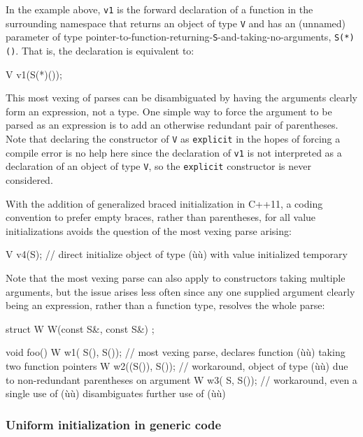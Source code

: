 \noindent In the example above, \lstinline!v1! is the forward declaration of a
function in the surrounding namespace that returns an object of type
\lstinline!V! and has an (unnamed) parameter of type
pointer-to-function-returning-\lstinline!S!-and-taking-no-arguments,
\lstinline!S(*)()!. That is, the declaration is equivalent to:

\begin{emcppslisting}
V v1(S(*)());
\end{emcppslisting}


\noindent This most vexing of parses can be disambiguated by having the arguments
clearly form an expression, not a type. One simple way to force the
argument to be parsed as an expression is to add an otherwise redundant
pair of parentheses. Note that declaring the constructor of \lstinline!V!
as \lstinline!explicit! in the hopes of forcing a compile error is no help
here since the declaration of \lstinline!v1! is not interpreted as a
declaration of an object of type \lstinline!V!, so the \lstinline!explicit!
constructor is never considered.

With the addition of generalized braced initialization in C++11, a
coding convention to prefer empty braces, rather than parentheses, for
all value initializations avoids the question of the most vexing parse
arising:

\begin{emcppslisting}
V v4(S{});  // direct initialize object of type (ù{}ù) with value initialized temporary
\end{emcppslisting}


\noindent Note that the most vexing parse can also apply to constructors taking
multiple arguments, but the issue arises less often since any one
supplied argument clearly being an expression, rather than a function
type, resolves the whole parse:

\begin{emcppslisting}
struct W { W(const S&, const S&) { } };

void foo() {
  W w1( S(),  S());  // most vexing parse, declares function (ù{}ù) taking two function pointers
  W w2((S()), S());  // workaround, object of type (ù{}ù) due to non-redundant parentheses on argument
  W w3( S{},  S());  // workaround, even a single use of (ù{}ù) disambiguates further use of (ù{}ù)
}
\end{emcppslisting}


\subsubsection[Uniform initialization in generic code]{Uniform initialization in generic code}\label{uniform-initialization-in-generic-code}


